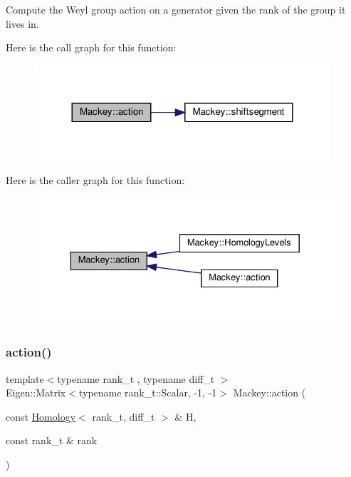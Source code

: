 Compute the Weyl group action on a generator given the rank of the group it lives in. 

Here is the call graph for this function\+:\nopagebreak
\begin{figure}[H]
\begin{center}
\leavevmode
\includegraphics[width=312pt]{namespaceMackey_aa515b26c0fbc7f19b36cee7d826f07b9_cgraph}
\end{center}
\end{figure}
Here is the caller graph for this function\+:\nopagebreak
\begin{figure}[H]
\begin{center}
\leavevmode
\includegraphics[width=329pt]{namespaceMackey_aa515b26c0fbc7f19b36cee7d826f07b9_icgraph}
\end{center}
\end{figure}
\mbox{\label{namespaceMackey_a2169692139cf46ac28719780e2a7f867}} 
\subsubsection{\texorpdfstring{action()}{action()}\hspace{0.1cm}{\footnotesize\ttfamily [2/2]}}
{\footnotesize\ttfamily template$<$typename rank\+\_\+t , typename diff\+\_\+t $>$ \\
Eigen\+::\+Matrix$<$typename rank\+\_\+t\+::\+Scalar, -\/1, -\/1$>$ Mackey\+::action (\begin{DoxyParamCaption}\item[{const \hyperlink{classMackey_1_1Homology}{Homology}$<$ rank\+\_\+t, diff\+\_\+t $>$ \&}]{H,  }\item[{const rank\+\_\+t \&}]{rank }\end{DoxyParamCaption})}



